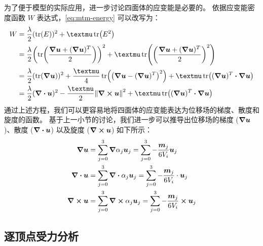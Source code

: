 为了便于模型的实际应用，进一步讨论四面体的应变能是必要的。
依据应变能密度函数 $W$ 表达式，\eqref{eq:mtm-energy} 可以改写为：
\begin{equation}
  \begin{split}
    W
     & = \frac{\lambda}{2} (\tr(E))^2 + \mu \tr(E^2)                                                                                                               \\
     & = \frac{\lambda}{2} \pqty{\tr(\frac{\grad{\bm{u}} + (\grad{\bm{u}})^T}{2})}^2 + \mu \tr(\pqty{\frac{\grad{\bm{u}} + (\grad{\bm{u}})^T}{2}}^2)               \\
     & = \frac{\lambda}{2} (\tr(\grad{\bm{u}}))^2 + \frac{\mu}{4} \tr(\pqty{\grad{\bm{u}} - (\grad{\bm{u}})^T}^2) + \mu \tr((\grad{\bm{u}})^T \vdot \grad{\bm{u}}) \\
     & = \frac{\lambda}{2} (\divergence{\bm{u}})^2 - \frac{\mu}{2} \norm{\curl{\bm{u}}}^2 + \mu \tr((\grad{\bm{u}})^T \vdot \grad{\bm{u}})
  \end{split}
\end{equation}
通过上述方程，我们可以更容易地将四面体的应变能表达为位移场的梯度、散度和旋度的函数。
基于上一小节的讨论，我们进一步可以推导出位移场的梯度 ($\grad{\bm{u}}$)、散度 ($\divergence{\bm{u}}$) 以及旋度 ($\curl{\bm{u}}$) 如下所示：
\begin{align}
  \grad{\bm{u}}
   & = \sum_{j = 0}^3 \grad{\alpha_j} \bm{u}_j
  = \sum_{j = 0}^3 - \frac{\bm{m}_j}{6 V_i} \bm{u}_j       \\
  \divergence{\bm{u}}
   & = \sum_{j = 0}^3 \divergence{\alpha_j} \bm{u}_j
  = \sum_{j = 0}^3 - \frac{\bm{m}_j}{6 V_i} \cdot \bm{u}_j \\
  \curl{\bm{u}}
   & = \sum_{j = 0}^3 \curl{\alpha_j} \bm{u}_j
  = \sum_{j = 0}^3 - \frac{\bm{m}_j}{6 V_i} \cp \bm{u}_j
\end{align}

\subsection{逐顶点受力分析}

